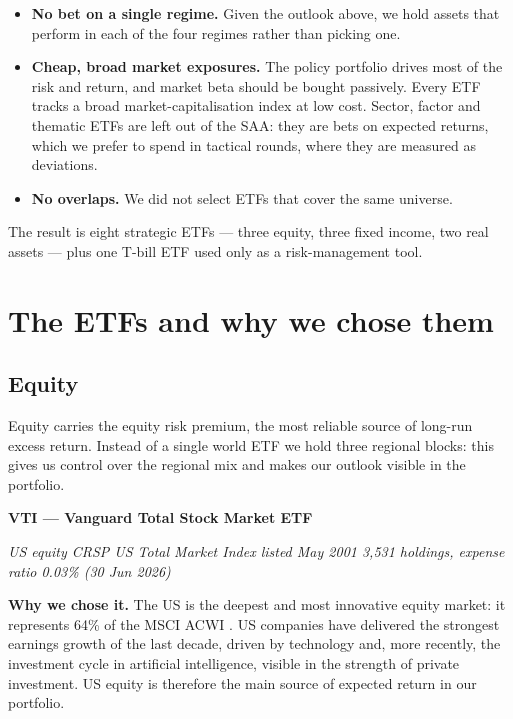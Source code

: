 \begin{itemize}
\item
  \textbf{No bet on a single regime.} Given the outlook above, we hold
  assets that perform in each of the four regimes rather than picking
  one.
\item
  \textbf{Cheap, broad market exposures.} The policy portfolio drives
  most of the risk and return, and market beta should be bought
  passively. Every ETF tracks a broad market-capitalisation index at low
  cost. Sector, factor and thematic ETFs are left out of the SAA: they
  are bets on expected returns, which we prefer to spend in tactical
  rounds, where they are measured as deviations.
\item
  \textbf{No overlaps.} We did not select ETFs that cover the same
  universe.
\end{itemize}

The result is eight strategic ETFs --- three equity, three fixed income,
two real assets --- plus one T-bill ETF used only as a risk-management
tool.

\section*{The ETFs and why we chose them}\label{sec:etfs}

\subsection*{Equity}\label{sec:equity}

Equity carries the equity risk premium, the most reliable source of
long-run excess return. Instead of a single world ETF we hold three
regional blocks: this gives us control over the regional mix and makes
our outlook visible in the portfolio.

\textbf{VTI --- Vanguard Total Stock Market ETF}

\emph{US equity \textperiodcentered{} CRSP US Total Market Index \textperiodcentered{} listed May 2001 \textperiodcentered{} 3,531
holdings, expense ratio 0.03\% (30 Jun 2026) \cite{vanguardvti}}

\textbf{Why we chose it.} The US is the deepest and most innovative
equity market: it represents 64\% of the MSCI ACWI \cite{msciacwi}. US companies
have delivered the strongest earnings growth of the last decade, driven
by technology and, more recently, the investment cycle in artificial
intelligence, visible in the strength of private investment. US equity
is therefore the main source of expected return in our portfolio.


